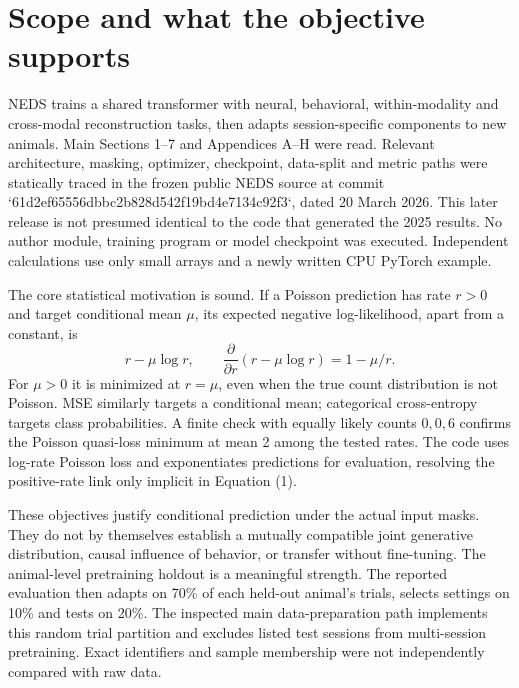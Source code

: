 \documentclass[10pt]{article}
\begin{document}
\section*{Scope and what the objective supports}
NEDS trains a shared transformer with neural, behavioral, within-modality and cross-modal reconstruction tasks, then adapts session-specific components to new animals. Main Sections 1–7 and Appendices A–H were read. Relevant architecture, masking, optimizer, checkpoint, data-split and metric paths were statically traced in the frozen public NEDS source at commit `61d2ef65556dbbc2b828d542f19bd4e7134c92f3`, dated 20 March 2026. This later release is not presumed identical to the code that generated the 2025 results. No author module, training program or model checkpoint was executed. Independent calculations use only small arrays and a newly written CPU PyTorch example.\par
The core statistical motivation is sound. If a Poisson prediction has rate \(r>0\) and target conditional mean \(\mu\), its expected negative log-likelihood, apart from a constant, is \[r-\mu\log r,\qquad \frac{\partial}{\partial r}(r-\mu\log r)=1-\mu/r.\] For \(\mu>0\) it is minimized at \(r=\mu\), even when the true count distribution is not Poisson. MSE similarly targets a conditional mean; categorical cross-entropy targets class probabilities. A finite check with equally likely counts \(0,0,6\) confirms the Poisson quasi-loss minimum at mean 2 among the tested rates. The code uses log-rate Poisson loss and exponentiates predictions for evaluation, resolving the positive-rate link only implicit in Equation (1).\par
These objectives justify conditional prediction under the actual input masks. They do not by themselves establish a mutually compatible joint generative distribution, causal influence of behavior, or transfer without fine-tuning. The animal-level pretraining holdout is a meaningful strength. The reported evaluation then adapts on 70\% of each held-out animal’s trials, selects settings on 10\% and tests on 20\%. The inspected main data-preparation path implements this random trial partition and excludes listed test sessions from multi-session pretraining. Exact identifiers and sample membership were not independently compared with raw data.\par
\end{document}
